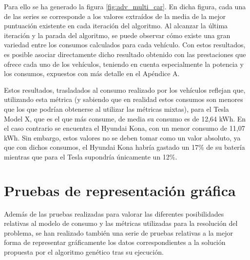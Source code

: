 \documentclass[11pt,spanish,listoffigures,listoftables]{tfgetsinf}
\begin{document}
Para ello se ha generado la figura \ref{fig:adv_multi_car}. En dicha figura, cada una de las series se corresponde a los valores extraídos de la media de la mejor puntuación existente en cada iteración del algoritmo. Al alcanzar la última iteración y la parada del algoritmo, se puede observar cómo existe una gran variedad entre los consumos calculados para cada vehículo. Con estos resultados, es posible asociar directamente dicho resultado obtenido con las prestaciones que ofrece cada uno de los vehículos, teniendo en cuenta especialmente la potencia y los consumos, expuestos con más detalle en el Apéndice A.

Estos resultados, trasladados al consumo realizado por los vehículos reflejan que, utilizando esta métrica (y sabiendo que en realidad estos consumos son menores que los que podrían obtenerse al utilizar las métricas mixtas), para el Tesla Model X, que es el que más consume, de media su consumo es de 12,64 kWh. En el caso contrario se encuentra el Hyundai Kona, con un menor consumo de 11,07 kWh. Sin embargo, estos valores no se deben tomar como un valor absoluto, ya que con dichos consumos, el Hyundai Kona habría gastado un 17\% de su batería mientras que para el Tesla supondría únicamente un 12\%.

\newpage
\section{Pruebas de representación gráfica}
Además de las pruebas realizadas para valorar las diferentes posibilidades relativas al modelo de consumo y las métricas utilizadas para la resolución del problema, se han realizado también una serie de pruebas relativas a la mejor forma de representar gráficamente los datos correspondientes a la solución propuesta por el algoritmo genético tras su ejecución.
\end{document}

